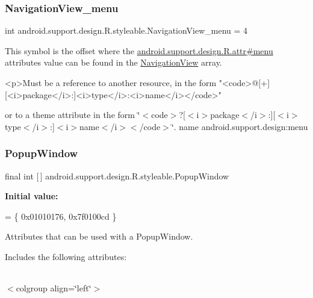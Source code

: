 \subsubsection{\texorpdfstring{Navigation\+View\+\_\+menu}{NavigationView\_menu}}
{\footnotesize\ttfamily int android.\+support.\+design.\+R.\+styleable.\+Navigation\+View\+\_\+menu = 4\hspace{0.3cm}{\ttfamily [static]}}

This symbol is the offset where the \hyperlink{classandroid_1_1support_1_1design_1_1R_1_1attr_af8dccc21578a5e68732ac4a904297821}{android.\+support.\+design.\+R.\+attr\#menu} attribute\textquotesingle{}s value can be found in the \hyperlink{classandroid_1_1support_1_1design_1_1R_1_1styleable_a277c199f371e8804c26e2cd6dbf88999}{Navigation\+View} array.

\begin{DoxyVerb}      <p>Must be a reference to another resource, in the form "<code>@[+][<i>package</i>:]<i>type</i>:<i>name</i></code>"
\end{DoxyVerb}
 or to a theme attribute in the form \char`\"{}$<$code$>$?\mbox{[}$<$i$>$package$<$/i$>$\+:\mbox{]}\mbox{[}$<$i$>$type$<$/i$>$\+:\mbox{]}$<$i$>$name$<$/i$>$$<$/code$>$\char`\"{}.  name android.\+support.\+design\+:menu \mbox{\label{classandroid_1_1support_1_1design_1_1R_1_1styleable_aa75bc963c35e5bb705cefe081e851f59}} 
\subsubsection{\texorpdfstring{Popup\+Window}{PopupWindow}}
{\footnotesize\ttfamily final int \mbox{[}$\,$\mbox{]} android.\+support.\+design.\+R.\+styleable.\+Popup\+Window\hspace{0.3cm}{\ttfamily [static]}}

{\bfseries Initial value\+:}
\begin{DoxyCode}
= \{
            0x01010176, 0x7f0100cd
        \}
\end{DoxyCode}
Attributes that can be used with a Popup\+Window. 

Includes the following attributes\+:

\tabulinesep=1mm
\begin{longtabu} spread 0pt [c]{*{0}{|X[-1]}|}
\hline
\end{longtabu}
$<$colgroup align=\char`\"{}left\char`\"{}$>$ 

